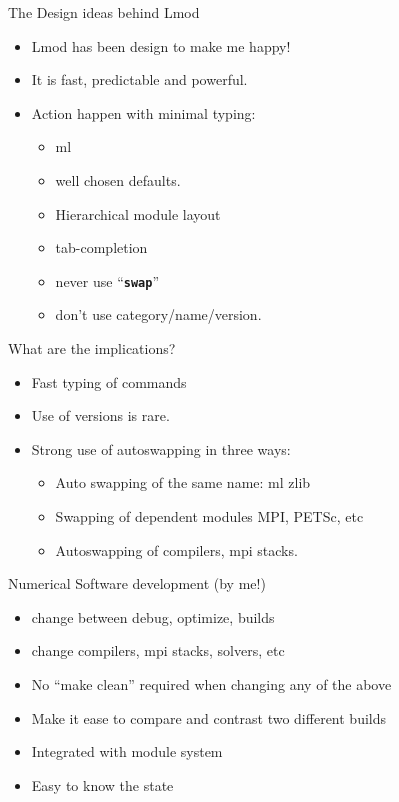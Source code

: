 \documentclass{beamer}
\begin{document}
\begin{frame}{The Design ideas behind Lmod}
  \begin{itemize}
     \item Lmod has been design to make me happy!
     \item It is fast, predictable and powerful.
     \item Action happen with minimal typing:
       \begin{itemize}
          \item ml
          \item well chosen defaults.      
          \item Hierarchical module layout
          \item tab-completion
          \item never use ``\texttt{\bf swap}''
          \item don't use category/name/version.
       \end{itemize}
  \end{itemize}
\end{frame}


\begin{frame}{What are the implications?}
  \begin{itemize}
     \item Fast typing of commands
     \item Use of versions is rare.
     \item Strong use of autoswapping in three ways:
       \begin{itemize}
          \item Auto swapping of the same name: ml zlib
          \item Swapping of dependent modules MPI, PETSc, etc
          \item Autoswapping of compilers, mpi stacks.
       \end{itemize}
  \end{itemize}
\end{frame}

\begin{frame}{Numerical Software development (by me!)}
  \begin{itemize}
    \item change between debug, optimize, builds
    \item change compilers, mpi stacks, solvers, etc
    \item No ``make clean'' required when changing any of the above
    \item Make it ease to compare and contrast two different builds
    \item Integrated with module system
    \item Easy to know the state
  \end{itemize}
\end{frame}
\end{document}
